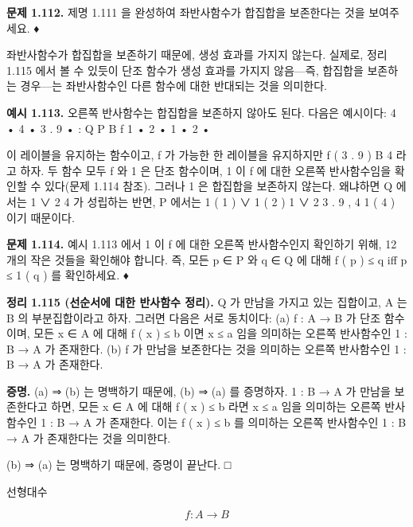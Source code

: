 \documentclass[11pt, a4paper, twoside, openany]{book}
\begin{document}
\par\medskip
\textbf{문제 1.112.} 제명 1.111 을 완성하여 좌반사함수가 합집합을 보존한다는 것을 보여주세요. ♦

\par\medskip
좌반사함수가 합집합을 보존하기 때문에, 생성 효과를 가지지 않는다. 실제로, 정리 1.115 에서 볼 수 있듯이 단조 함수가 생성 효과를 가지지 않음—즉, 합집합을 보존하는 경우—는 좌반사함수인 다른 함수에 대한 반대되는 것을 의미한다.

\par\medskip
\textbf{예시 1.113.} 오른쪽 반사함수는 합집합을 보존하지 않아도 된다. 다음은 예시이다:
4 •
4 •
3 . 9 •
 : Q
P B
f
1 •
2 •
1 •
2 •

\par{} 이 레이블을 유지하는 함수이고, f 가 가능한 한 레이블을 유지하지만 f ( 3 . 9 ) B 4 라고 하자. 두 함수 모두 f 와 1 은 단조 함수이며, 1 이 f 에 대한 오른쪽 반사함수임을 확인할 수 있다(문제 1.114 참조). 그러나 1 은 합집합을 보존하지 않는다. 왜냐하면 Q 에서는 1 ∨ 2  4 가 성립하는 반면, P 에서는 1 ( 1 ) ∨ 1 ( 2 )  1 ∨ 2  3 . 9 , 4  1 ( 4 ) 이기 때문이다.

\par\medskip
\textbf{문제 1.114.} 예시 1.113 에서 1 이 f 에 대한 오른쪽 반사함수인지 확인하기 위해, 12 개의 작은 것들을 확인해야 합니다. 즉, 모든 p ∈ P 와 q ∈ Q 에 대해 f ( p ) ≤ q iﬀ p ≤ 1 ( q ) 를 확인하세요. ♦

\par\medskip
\textbf{정리 1.115 (선순서에 대한 반사함수 정리).} Q 가 만남을 가지고 있는 집합이고, A 는 B 의 부분집합이라고 하자. 그러면 다음은 서로 동치이다:
(a) f : A → B 가 단조 함수이며, 모든 x ∈ A 에 대해 f ( x ) ≤ b 이면 x ≤ a 임을 의미하는 오른쪽 반사함수인 1 : B → A 가 존재한다.
(b) f 가 만남을 보존한다는 것을 의미하는 오른쪽 반사함수인 1 : B → A 가 존재한다.

\par\medskip
\textbf{증명.} (a) ⇒ (b) 는 명백하기 때문에, (b) ⇒ (a) 를 증명하자. 1 : B → A 가 만남을 보존한다고 하면, 모든 x ∈ A 에 대해 f ( x ) ≤ b 라면 x ≤ a 임을 의미하는 오른쪽 반사함수인 1 : B → A 가 존재한다. 이는 f ( x ) ≤ b 를 의미하는 오른쪽 반사함수인 1 : B → A 가 존재한다는 것을 의미한다.

\par\medskip
(b) ⇒ (a) 는 명백하기 때문에, 증명이 끝난다. □

\par\medskip
선형대수

\par\medskip
$$f:A\rightarrow B$$
\end{document}
